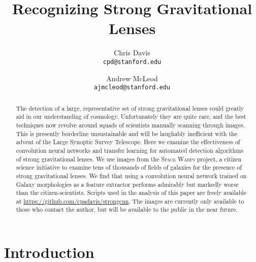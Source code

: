 \documentclass[10pt,twocolumn,letterpaper]{article}
\begin{document}
\title{Recognizing Strong Gravitational Lenses}

\author{Chris Davis\\
{\tt\small cpd@stanford.edu}
\and
Andrew McLeod\\
{\tt\small ajmcleod@stanford.edu}
}

\maketitle

\begin{abstract}
    The detection of a large, representative set of strong gravitational lenses
    could greatly aid in our understanding of cosmology. Unfortunately they are
    quite rare, and the best techniques now revolve around squads of scientists
    manually scanning through images. This is presently borderline
    unsustainable and will be laughably inefficient with the advent of the
    Large Synoptic Survey Telescope. Here we examine the effectiveness of
    convolution neural networks and transfer learning for automated detection
    algorithms of strong gravitational lenses. We use images from the
    \textsc{Space Warps} project, a citizen science initiative to examine tens
    of thousands of fields of galaxies for the presence of strong gravitational
    lenses. 
    We find that using a convolution neural network trained on Galaxy
    morphologies as a feature extractor performs admirably but markedly worse
    than the citizen-scientists.
    Scripts used in the analysis of this paper are freely available at
    \url{https://github.com/cpadavis/strongcnn}. The images are currently only
    available to those who contact the author, but will be available to the
    public in the near future.
\end{abstract}

\section{Introduction}

\end{document}
